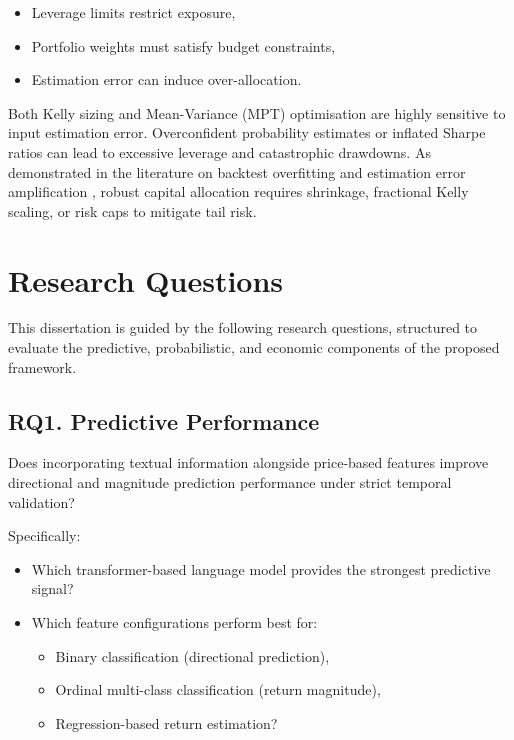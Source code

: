 \documentclass{l4proj}
\begin{document}
\begin{itemize}
    \item Leverage limits restrict exposure,
    \item Portfolio weights must satisfy budget constraints,
    \item Estimation error can induce over-allocation.
\end{itemize}

Both Kelly sizing and Mean-Variance (MPT) optimisation are highly sensitive to input estimation error. Overconfident probability estimates or inflated Sharpe ratios can lead to excessive leverage and catastrophic drawdowns. As demonstrated in the literature on backtest overfitting and estimation error amplification \citep{Bailey13, LopezdePrado2018-LPEAIF}, robust capital allocation requires shrinkage, fractional Kelly scaling, or risk caps to mitigate tail risk.

\section{Research Questions}

This dissertation is guided by the following research questions, structured to evaluate the predictive, probabilistic, and economic components of the proposed framework.

\subsection*{RQ1. Predictive Performance}

Does incorporating textual information alongside price-based features improve directional and magnitude prediction performance under strict temporal validation?

Specifically:

\begin{itemize}
    \item Which transformer-based language model provides the strongest predictive signal?
    \item Which feature configurations perform best for:
    \begin{itemize}
        \item Binary classification (directional prediction),
        \item Ordinal multi-class classification (return magnitude),
        \item Regression-based return estimation?
    \end{itemize}
\end{itemize}
\end{document}
